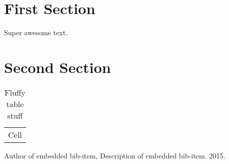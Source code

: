 \documentclass{article}
\begin{document}
\section{First Section} %
\label{sec:first_section}

Super awesome text.


\section{Second Section} %
\label{sec:second_section}


\begin{table}[htbp]
    \caption{Fluffy table stuff}
    \begin{center}
        \begin{tabular}{c}
            Cell
        \end{tabular}
    \end{center}
    \label{table:a_table_label}
\end{table}



\begin{thebibliography}{9}
      Author of embedded bib-item,
      Description of embedded bib-item.
      2015.
\end{thebibliography}
\end{document}
